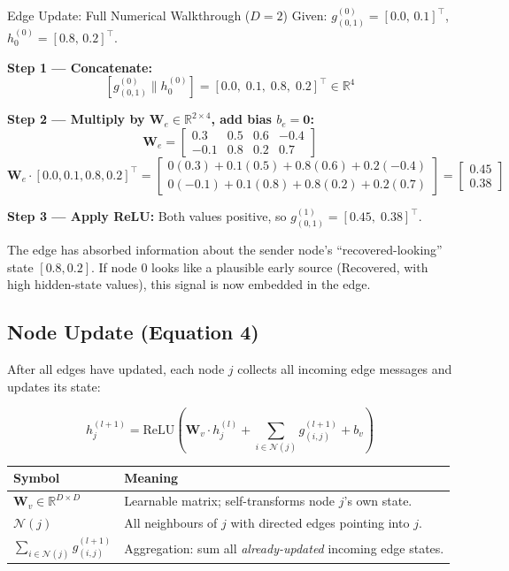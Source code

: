 \begin{examplebox}{Edge Update: Full Numerical Walkthrough ($D=2$)}
Given: $g_{(0,1)}^{(0)} = [0.0,\, 0.1]^\top$, \; $h_0^{(0)} = [0.8,\, 0.2]^\top$.

\textbf{Step 1 — Concatenate:}
\[
[g_{(0,1)}^{(0)} \| h_0^{(0)}] = [0.0,\; 0.1,\; 0.8,\; 0.2]^\top \in \mathbb{R}^4
\]

\textbf{Step 2 — Multiply by $\mathbf{W}_e \in \mathbb{R}^{2\times 4}$, add bias $b_e = \mathbf{0}$:}
\[
\mathbf{W}_e = \begin{bmatrix}0.3 & 0.5 & 0.6 & -0.4 \\ -0.1 & 0.8 & 0.2 & 0.7\end{bmatrix}
\]
\[
\mathbf{W}_e \cdot [0.0, 0.1, 0.8, 0.2]^\top = \begin{bmatrix}0(0.3)+0.1(0.5)+0.8(0.6)+0.2(-0.4)\\0(-0.1)+0.1(0.8)+0.8(0.2)+0.2(0.7)\end{bmatrix} = \begin{bmatrix}0.45\\0.38\end{bmatrix}
\]

\textbf{Step 3 — Apply ReLU:} Both values positive, so $g_{(0,1)}^{(1)} = [0.45,\; 0.38]^\top$.

The edge has absorbed information about the sender node's ``recovered-looking'' state $[0.8, 0.2]$. If node 0 looks like a plausible early source (Recovered, with high hidden-state values), this signal is now embedded in the edge.
\end{examplebox}

\subsection{Node Update (Equation 4)}

After all edges have updated, each node $j$ collects all incoming edge messages and updates its state:

\begin{equation}
\boxed{h_j^{(l+1)} = \text{ReLU}\!\left(\mathbf{W}_v \cdot h_j^{(l)} + \sum_{i \in \mathcal{N}(j)} g_{(i,j)}^{(l+1)} + b_v\right)}
\label{eq:node_update}
\end{equation}

\begin{center}
\renewcommand{\arraystretch}{1.4}
\begin{tabular}{p{} p{}}
\toprule
\textbf{Symbol} & \textbf{Meaning} \\
\midrule
$\mathbf{W}_v \in \mathbb{R}^{D \times D}$ & Learnable matrix; self-transforms node $j$'s own state. \\
$\mathcal{N}(j)$ & All neighbours of $j$ with directed edges pointing into $j$. \\
$\sum_{i \in \mathcal{N}(j)} g_{(i,j)}^{(l+1)}$ & Aggregation: sum all \emph{already-updated} incoming edge states. \\
\bottomrule
\end{tabular}
\end{center}

